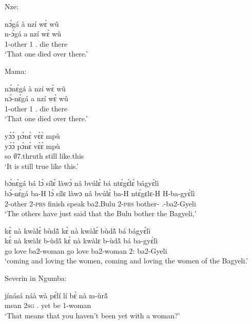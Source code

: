 \noindent Nze: 

\begin{exe}[(C234)]  
\exC\label{174} 
  \glll nɔ́gá à nzí wɛ̀ wû \\
        n-ɔ́gá a nzí wɛ̀ wû \\
         1-other 1 {\PROG}.{\PST}  die there   \\
    \trans `That one died over there.'
\end{exe}

\noindent Mama:

\begin{exe}[(C234)] 
\exC\label{175} 
  \glll nɔ́nɛ́gá à nzí wɛ̀ wû \\
         nɔ́-nɛ́gá a nzí wɛ̀ wû \\
         1-other 1 {\PROG}.{\PST}  die there \\
    \trans `That one died over there.'
 
\exC\label{176}
  \glll yɔ́ɔ̀ pɔ̀nɛ̀ vɛ̀ɛ̀ mpù \\
        yɔ́ɔ̀ pɔ̀nɛ̀ vɛ̀ɛ̀ mpù \\
         so $\emptyset$7.thruth still like.this \\
    \trans `It is still true like this.'
 
\exC\label{177}
  \glll bɔ́nɛ́gá bá lɔ́ sílɛ̀ làwɔ̀ nâ bvúlɛ̀ bá ntɛ́gɛ́lɛ́ bágyɛ̀lì\\
      bɔ́-nɛ́gá ba-H lɔ́ sílɛ làwɔ nâ bvúlɛ̀ ba-H ntɛ́gɛlɛ-H H-ba-gyɛ̀lì\\
        2-other 2-\textsc{prs} {\RETRO}   finish speak {\COMP} ba2.Bulu 2-\textsc{prs} bother-{\R} {\OBJ}.{\LINK}-ba2-Gyeli\\
    \trans `The others have just said that the Bulu bother the Bagyeli,'
 
\exC\label{178}
  \glll kɛ̀ nà kwàlɛ̀ bùdã̂ kɛ̀ nà kwàlɛ̀ bùdã̂ bá bágyɛ̀lì\\
        kɛ̀ nà kwàlɛ b-ùdã̂ kɛ̀ nà kwàlɛ b-ùdã̂ bá ba-gyɛ̀lì\\
         go {\CONJ} love ba2-woman go {\CONJ} love ba2-woman  2:{\ATT}  ba2-Gyeli\\
    \trans `coming and loving the women, coming and loving the women of the Bagyeli.'
\end{exe}

\noindent Severin in Ngumba:

\begin{exe}[(C234)]  
\exC\label{179} 
  \gll  jínásá náà wà pɛ́lí lí bɛ̀ nà m-ùrã̂ \\
          mean {\COMP} 2\textsc{sg} {\NEG}.{\PST}  yet be {\COM} 1-woman \\
    \trans `That means that you haven't been yet with a woman?'
\end{exe}

